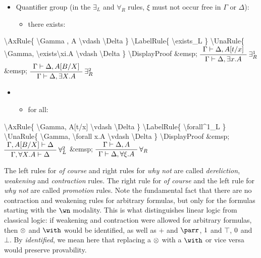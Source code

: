 \begin{itemize}
\tightlist
\item
  Quantifier group (in the \(\exists_L\) and \(\forall_R\) rules,
  \(\xi\) must not occur free in \(\Gamma\) or \(\Delta\)):

  \begin{itemize}
  \tightlist
  \item
    there exists: 
  \end{itemize}
\end{itemize}

\textbackslash{}AxRule\{ \textbackslash{}Gamma , A \textbackslash{}vdash
\textbackslash{}Delta \} \textbackslash{}LabelRule\{
\textbackslash{}exists\_L \} \textbackslash{}UnaRule\{
\textbackslash{}Gamma, \textbackslash{}exists\textbackslash{}xi.A
\textbackslash{}vdash \textbackslash{}Delta \}
\textbackslash{}DisplayProof \&emsp;
\(\AxRule{ \Gamma \vdash \Delta, A[t/x] }
\LabelRule{ \exists^1_R }
\UnaRule{ \Gamma \vdash \Delta, \exists x.A }
\DisplayProof\) \&emsp; \(\AxRule{ \Gamma \vdash \Delta, A[B/X] }
\LabelRule{ \exists^2_R }
\UnaRule{ \Gamma \vdash \Delta, \exists X.A }
\DisplayProof\)

\begin{itemize}
\item
  \begin{itemize}
  \tightlist
  \item
    for all: 
  \end{itemize}
\end{itemize}

\textbackslash{}AxRule\{ \textbackslash{}Gamma, A{[}t/x{]}
\textbackslash{}vdash \textbackslash{}Delta \}
\textbackslash{}LabelRule\{ \textbackslash{}forall\^{}1\_L \}
\textbackslash{}UnaRule\{ \textbackslash{}Gamma, \textbackslash{}forall
x.A \textbackslash{}vdash \textbackslash{}Delta \}
\textbackslash{}DisplayProof \&emsp;
\(\AxRule{ \Gamma, A[B/X] \vdash \Delta }
\LabelRule{ \forall^2_L }
\UnaRule{ \Gamma, \forall X.A \vdash \Delta }
\DisplayProof\) \&emsp; \(\AxRule{ \Gamma \vdash \Delta, A }
\LabelRule{ \forall_R }
\UnaRule{ \Gamma \vdash \Delta, \forall\xi.A }
\DisplayProof\)

The left rules for \emph{of course} and right rules for \emph{why not}
are called \emph{dereliction}, \emph{weakening} and \emph{contraction}
rules. The right rule for \emph{of course} and the left rule for
\emph{why not} are called \emph{promotion} rules. Note the fundamental
fact that there are no contraction and weakening rules for arbitrary
formulas, but only for the formulas starting with the \(\wn\) modality.
This is what distinguishes linear logic from classical logic: if
weakening and contraction were allowed for arbitrary formulas, then
\(\otimes\) and \(\with\) would be identified, as well as \(\plus\) and
\(\parr\), \(1\) and \(\top\), \(0\) and \(\bot\). By
\emph{identified}, we mean here that replacing a \(\otimes\) with a
\(\with\) or vice versa would preserve provability.

